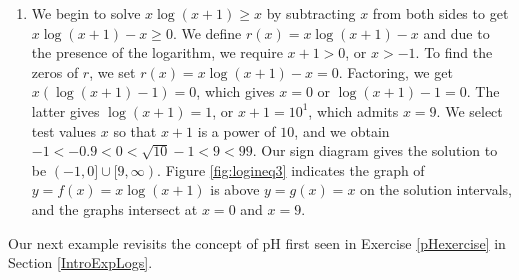{\begin{enumerate}
\item  We begin to solve $x \log(x+1) \geq x$ by subtracting $x$ from both sides to get $x \log(x+1)  - x \geq 0$.  We define $r(x) = x \log(x+1)  - x $ and due to the presence of the logarithm, we require $x+1 > 0$, or $x > -1$.  To find the zeros of $r$, we set $r(x) = x \log(x+1)  - x = 0$.  Factoring, we get $x \left(\log(x+1) - 1\right) = 0$, which gives $x=0$ or $\log(x+1) - 1=0$.  The latter gives $\log(x+1) = 1$, or $x+1 = 10^{1}$, which admits $x = 9$.  We select test values $x$ so that $x+1$ is a power of $10$, and we obtain $-1 < -0.9 < 0 < \sqrt{10} -1 < 9 < 99$.  Our sign diagram gives the solution to be $(-1,0] \cup [9, \infty)$. Figure \ref{fig:logineq3} indicates the graph of $y= f(x) = x \log(x+1)$ is above $y=g(x) = x$ on the solution intervals, and the graphs intersect at $x=0$ and $x=9$.


{}

\end{enumerate}
}


\medskip

Our next example revisits the concept of pH first seen in Exercise \ref{pHexercise} in Section \ref{IntroExpLogs}.  

\medskip

